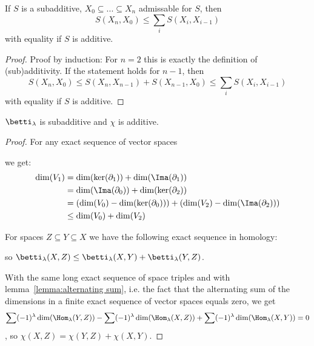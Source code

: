 \begin{lemma}
   \label{lemma:subadditivity}
   If $S$ is a subadditive, $X_0 \subseteq ... \subseteq X_n$ admissable for $S$,
   then 
   \[ S(X_n, X_0) \leq \sum_i S(X_i, X_{i-1}) \]
   with equality if $S$ is additive.
\end{lemma}

\begin{proof}
   Proof by induction: For $n=2$ this is exactly the definition of (sub)additivity.
   If the statement holds for $n - 1$, then
   \[ S(X_n, X_0) \leq S(X_n, X_{n-1}) + S(X_{n-1}, X_0) \leq \sum_i S(X_i, X_{i-1}) \]
   with equality if $S$ is additive.
\end{proof}

\begin{lemma}
   \label{lemma:subadditivity of b}
   $\betti_{\lambda}$ is subadditive and $\chi$ is additive.
\end{lemma}

\begin{proof}
   For any exact sequence of vector spaces 
   \begin{figure}[H]
      \centering
   \end{figure}
   we get:
   \begin{align*}
      \dim(V_1) 
      & = \dim(\ker(\del_1)) + \dim (\Ima(\del_1)) \\
      & = \dim(\Ima(\del_0)) + \dim(\ker(\del_2)) \\
      & = ( \dim (V_0) - \dim (\ker (\del_0)) ) + ( \dim (V_2) - \dim (\Ima (\del_2)) ) \\
      & \leq \dim(V_0) + \dim(V_2)
   \end{align*}

   For spaces $Z \subseteq Y \subseteq X$ we have the following exact sequence 
   in homology:

   \begin{figure}[H]
      \centering
   \end{figure}

   so $\betti_{\lambda}(X, Z) \leq \betti_{\lambda}(X, Y) + \betti_{\lambda}(Y, Z)$.

   With the same long exact sequence of space triples and with 
   lemma~\ref{lemma:alternating sum}, i.e. the fact that the alternating sum of
   the dimensions in a finite exact sequence of vector spaces equals zero, we get
   \[ 
      \sum (-1)^{\lambda}\dim(\Hom_{\lambda}(Y, Z)) 
      - \sum (-1)^{\lambda}\dim(\Hom_{\lambda}(X, Z)) 
      + \sum (-1)^{\lambda}\dim(\Hom_{\lambda}(X, Y))
      = 0 
   \]
   , so $\chi(X, Z) = \chi(Y, Z) + \chi(X, Y)$.
\end{proof}

